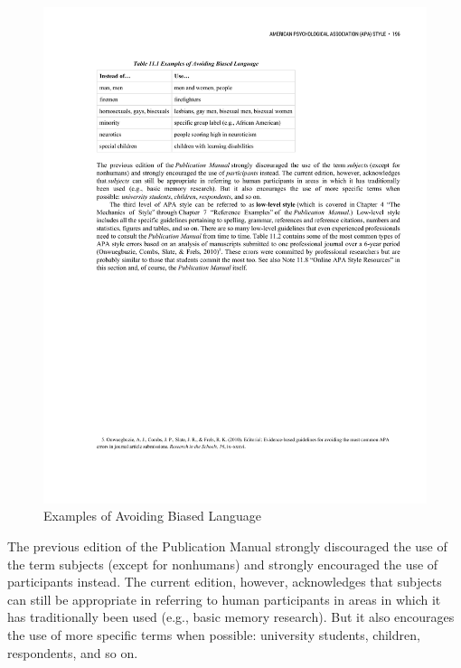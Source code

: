 \begin{figure}
 



\includegraphics[width=\linewidth]{figures/C11biased.pdf}
 



\caption{Examples of Avoiding Biased Language
}
 



\label{fig:biased}
 



\end{figure}

The previous edition of the Publication Manual strongly discouraged the use of the term subjects (except for nonhumans) and strongly encouraged the use of participants instead. The current edition, however, acknowledges that subjects can still be appropriate in referring to human participants in areas in which it has traditionally been used (e.g., basic memory research). But it also encourages the use of more specific terms when possible: university students, children, respondents, and so on.


